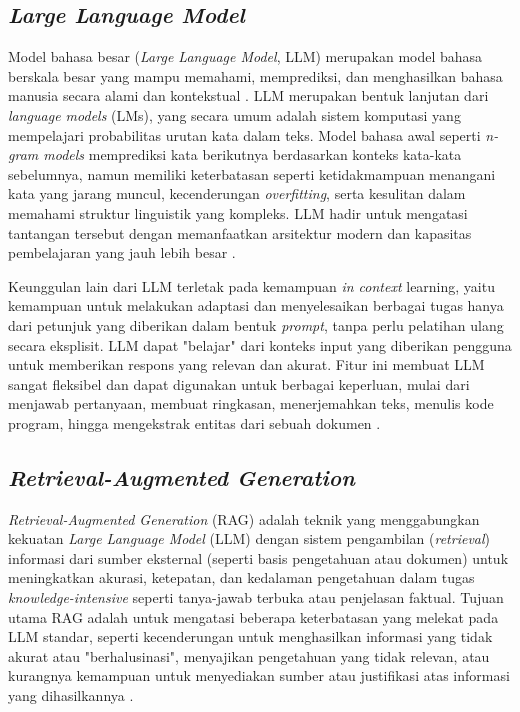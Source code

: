 \subsection{\textit{Large Language Model}}
Model bahasa besar (\textit{Large Language Model}, LLM) merupakan model bahasa berskala besar yang mampu memahami, memprediksi, dan menghasilkan bahasa manusia secara alami dan kontekstual \cite{Chang2024SurveyonLLM}.
LLM merupakan bentuk lanjutan dari \textit{language models} (LMs), yang secara umum adalah sistem komputasi yang mempelajari probabilitas urutan kata dalam teks.
Model bahasa awal seperti \textit{n-gram models} memprediksi kata berikutnya berdasarkan konteks kata-kata sebelumnya, namun memiliki keterbatasan seperti ketidakmampuan menangani kata yang jarang muncul, kecenderungan \textit{overfitting}, serta kesulitan dalam memahami struktur linguistik yang kompleks.
LLM hadir untuk mengatasi tantangan tersebut dengan memanfaatkan arsitektur modern dan kapasitas pembelajaran yang jauh lebih besar \cite{Chang2024SurveyonLLM}.

Keunggulan lain dari LLM terletak pada kemampuan \textit{in context} learning, yaitu kemampuan untuk melakukan adaptasi dan menyelesaikan berbagai tugas hanya dari petunjuk yang diberikan dalam bentuk \textit{prompt}, tanpa perlu pelatihan ulang secara eksplisit.
LLM dapat "belajar" dari konteks input yang diberikan pengguna untuk memberikan respons yang relevan dan akurat.
Fitur ini membuat LLM sangat fleksibel dan dapat digunakan untuk berbagai keperluan, mulai dari menjawab pertanyaan, membuat ringkasan, menerjemahkan teks, menulis kode program, hingga mengekstrak entitas dari sebuah dokumen \cite{Chang2024SurveyonLLM}.


\subsection{\textit{Retrieval-Augmented Generation}}
\textit{Retrieval-Augmented Generation} (RAG) adalah teknik yang menggabungkan kekuatan \textit{Large Language Model} (LLM) dengan sistem pengambilan (\textit{retrieval}) informasi dari sumber eksternal (seperti basis pengetahuan atau dokumen) untuk meningkatkan akurasi, ketepatan, dan kedalaman pengetahuan dalam tugas \textit{knowledge-intensive} seperti tanya-jawab terbuka atau penjelasan faktual.
Tujuan utama RAG adalah untuk mengatasi beberapa keterbatasan yang melekat pada LLM standar, seperti kecenderungan untuk menghasilkan informasi yang tidak akurat atau "berhalusinasi", menyajikan pengetahuan yang tidak relevan, atau kurangnya kemampuan untuk menyediakan sumber atau justifikasi atas informasi yang dihasilkannya \cite{Lewis2021RAGKnowledgeIntensiveNLP}.


